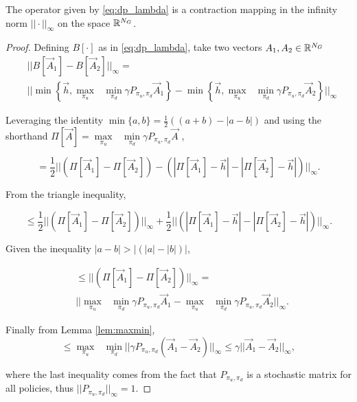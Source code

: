 \begin{proposition} 
The operator given by \eqref{eq:dp_lambda} is a contraction mapping in the infinity norm $|| \cdot ||_{\infty}$ on the space $\mathbb{R}^{N_G}$.
\end{proposition}
\begin{proof} Defining $B[\cdot]$ as in \eqref{eq:dp_lambda}, take two vectors $A_1, A_2 \in \mathbb{R}^{N_G}$
\begin{equation*}
\begin{split}
&||B[\vec{A}_1] - B[\vec{A}_2]||_{\infty}=\\
&||\min\left\{ \vec{h}, \underset{\pi_u}{\max}\text{ }\underset{ \pi_d}{\min} \gamma P_{\pi_u, \pi_d} \vec{A}_1 \right \}  - \min\left\{ \vec{h}, \underset{\pi_u}{\max}\text{ }\underset{ \pi_d}{\min} \gamma P_{\pi_u, \pi_d} \vec{A}_2 \right \}||_{\infty}
\end{split}
\end{equation*}

\noindent Leveraging the identity $\min\{a,b\} = \frac{1}{2}((a+b)- |a-b|)$ and using the shorthand $\Pi[\vec{A}]=\underset{\pi_u}{\max}\text{ }\underset{ \pi_d}{\min} \gamma P_{\pi_u, \pi_d} \vec{A}$ ,

\begin{equation*}
= \frac{1}{2} ||(\Pi[\vec{A}_1]  - \Pi[\vec{A}_2] ) -  (|\Pi[\vec{A}_1]-\vec{h}|  - |\Pi[\vec{A}_2]-\vec{h}|)||_{\infty}.
\end{equation*}

\noindent From the triangle inequality,

\begin{equation*}
\leq \frac{1}{2} ||(\Pi[\vec{A}_1]  - \Pi[\vec{A}_2] )||_{\infty} + \frac{1}{2}  ||(|\Pi[\vec{A}_1]-\vec{h}|  - |\Pi[\vec{A}_2]-\vec{h}|)||_{\infty}.
\end{equation*}

\noindent Given the inequality $|a-b| > |(|a|-|b|)|$,

\begin{equation*}
\begin{split}
&\leq ||(\Pi[\vec{A}_1]  - \Pi[\vec{A}_2] )||_{\infty}=\\ 
&||\underset{\pi_u}{\max}\text{ }\underset{ \pi_d}{\min} \gamma P_{\pi_u, \pi_d}\vec{A}_1 - \underset{\pi_u}{\max}\text{ }\underset{ \pi_d}{\min} \gamma P_{\pi_u, \pi_d} \vec{A}_2||_{\infty}.
\end{split}
\end{equation*}

\noindent Finally from Lemma \ref{lem:maxmin},
\begin{equation*}
\leq \underset{\pi_u}{\max}\text{ }\underset{ \pi_d}{\min} ||\gamma P_{\pi_u, \pi_d} (\vec{A}_1 - \vec{A}_2)||_{\infty} \leq \gamma||\vec{A}_1 - \vec{A}_2||_{\infty},
\end{equation*}

\noindent where the last inequality comes from the fact that $P_{\pi_u, \pi_d}$ is a stochastic matrix for all policies, thus $||P_{\pi_u, \pi_d}||_{\infty} = 1$.
\end{proof}



